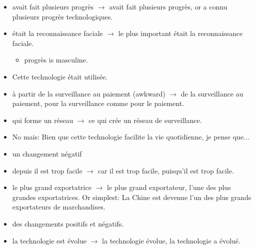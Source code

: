 \documentclass{book}
\begin{document}
\begin{itemize}
                \item avait fait plusieurs progrès $\to$ avait fait plusieurs progrès, or a connu plusieurs progrès technologiques.
                \item était la reconnaissance faciale $\to$ le plus important était la reconnaissance faciale.
                \begin{itemize}
                    \item progrès is masculine.
                \end{itemize}
                \item Cette technologie était utilisée.
                \item à partir de la surveillance au paiement (awkward) $\to$ de la surveillance au paiement, pour la surveillance comme pour le paiement.
                \item qui forme un réseau $\to$ ce qui crée un réseau de surveillance.
                \item No mais: Bien que cette technologie facilite la vie quotidienne, je pense que...
                \item un changement négatif
                \item depuis il est trop facile $\to$ car il est trop facile, puisqu'il est trop facile.
                \item le plus grand exportatrice $\to$ le plus grand exportateur, l'une des plus grandes exportatrices. Or simplest: La Chine est devenue l'un des plus grands exportateurs de marchandises.
                \item des changements positifs et négatifs.
                \item la technologie est évolue $\to$ la technologie évolue, la technologie a évolué.
            \end{itemize}
\end{document}
